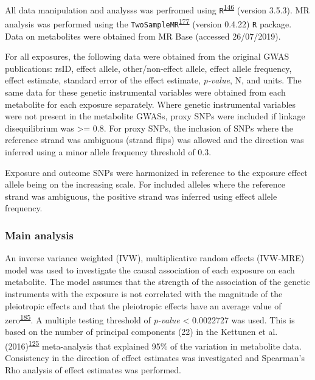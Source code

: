 \documentclass[11pt,twoside]{bristolthesis}
\begin{document}
All data manipulation and analysss was perfromed using \texttt{R}\textsuperscript{\protect\hyperlink{ref-r2019}{146}} (version 3.5.3). MR analysis was performed using the \texttt{TwoSampleMR}\textsuperscript{\protect\hyperlink{ref-Hemani2018}{177}} (version 0.4.22) \texttt{R} package. Data on metabolites were obtained from MR Base (accessed 26/07/2019).

For all exposures, the following data were obtained from the original GWAS publications: rsID, effect allele, other/non-effect allele, effect allele frequency, effect estimate, standard error of the effect estimate, \emph{p-value}, N, and units. The same data for these genetic instrumental variables were obtained from each metabolite for each exposure separately. Where genetic instrumental variables were not present in the metabolite GWASs, proxy SNPs were included if linkage disequilibrium was \textgreater{}= 0.8. For proxy SNPs, the inclusion of SNPs where the reference strand was ambiguous (strand flips) was allowed and the direction was inferred using a minor allele frequency threshold of 0.3.

Exposure and outcome SNPs were harmonized in reference to the exposure effect allele being on the increasing scale. For included alleles where the reference strand was ambiguous, the positive strand was inferred using effect allele frequency.

\hypertarget{main-analysis}{%
\subsubsection{Main analysis}\label{main-analysis}}

An inverse variance weighted (IVW), multiplicative random effects (IVW-MRE) model was used to investigate the causal association of each exposure on each metabolite. The model assumes that the strength of the association of the genetic instruments with the exposure is not correlated with the magnitude of the pleiotropic effects and that the pleiotropic effects have an average value of zero\textsuperscript{\protect\hyperlink{ref-Bowden2017}{185}}. A multiple testing threshold of \emph{p-value} \textless{} 0.0022727 was used. This is based on the number of principal components (22) in the Kettunen et al. (2016)\textsuperscript{\protect\hyperlink{ref-Kettunen2016}{125}} meta-analysis that explained 95\% of the variation in metabolite data. Consistency in the direction of effect estimates was investigated and Spearman's Rho analysis of effect estimates was performed.
\end{document}
